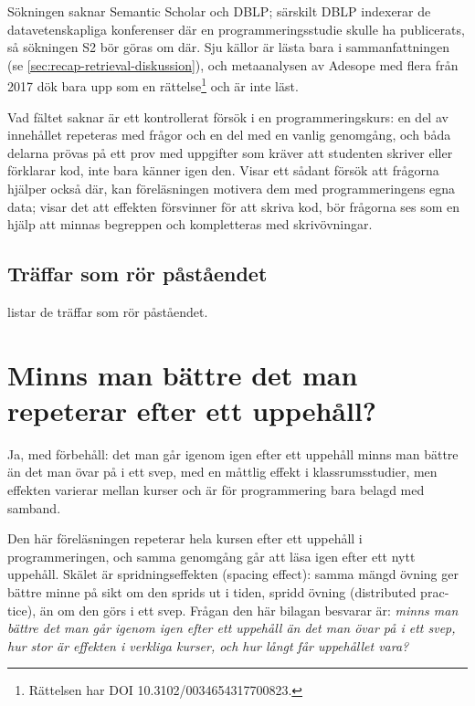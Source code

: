 Sökningen saknar Semantic Scholar och DBLP; särskilt DBLP indexerar de
datavetenskapliga konferenser där en programmeringsstudie skulle ha
publicerats, så sökningen S2 bör göras om där.  Sju källor är lästa
bara i sammanfattningen (se \cref{sec:recap-retrieval-diskussion}), och
metaanalysen av Adesope med flera från 2017 dök bara upp som en
rättelse\footnote{Rättelsen har DOI 10.3102/0034654317700823.} och är
inte läst.

Vad fältet saknar är ett kontrollerat försök i en programmeringskurs: en
del av innehållet repeteras med frågor och en del med en vanlig
genomgång, och båda delarna prövas på ett prov med uppgifter som kräver
att studenten skriver eller förklarar kod, inte bara känner igen den.
Visar ett sådant försök att frågorna hjälper också där, kan föreläsningen
motivera dem med programmeringens egna data; visar det att effekten
försvinner för att skriva kod, bör frågorna ses som en hjälp att minnas
begreppen och kompletteras med skrivövningar.

\section{Träffar som rör påståendet}

 listar de träffar som rör påståendet.




\chapter{Minns man bättre det man repeterar efter ett uppehåll?}
\label{app:recap-spacing}

Ja, med förbehåll: det man går igenom igen efter ett uppehåll minns man
bättre än det man övar på i ett svep, med en måttlig effekt i
klassrumsstudier, men effekten varierar mellan kurser och är för
programmering bara belagd med samband.

Den här föreläsningen repeterar hela kursen efter ett uppehåll i
programmeringen, och samma genomgång går att läsa igen efter ett nytt
uppehåll.  Skälet är spridningseffekten (\foreignlanguage{english}{spacing
effect}): samma mängd övning ger bättre minne på sikt om den sprids ut i
tiden, spridd övning (\foreignlanguage{english}{distributed practice}),
än om den görs i ett svep\autocite{Cepeda2006Distributed}.  Frågan den
här bilagan besvarar är: \emph{minns man bättre det man går igenom igen
efter ett uppehåll än det man övar på i ett svep, hur stor är effekten i
verkliga kurser, och hur långt får uppehållet vara?}

